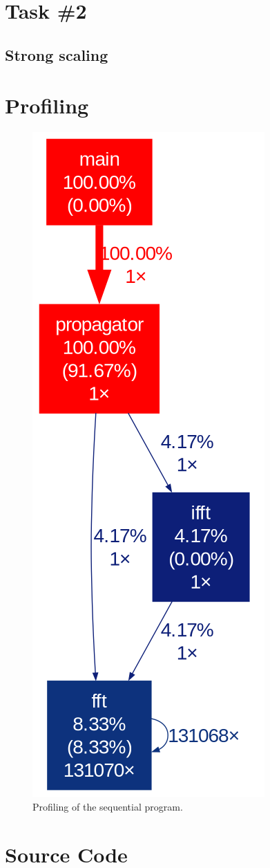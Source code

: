 \documentclass{article}
\begin{document}
\section{Task \#2}
\subsection{Strong scaling}


\appendix
\newpage
\section{Profiling}
\label{sec:Profiling}
\begin{figure}[h]
    \includegraphics[height=0.6\textheight]{figures/gprof_seq.png}
    \centering
    \caption*{Profiling of the sequential program.}
\end{figure}
\FloatBarrier
\section{Source Code}
\label{sec:source}

\end{document}
